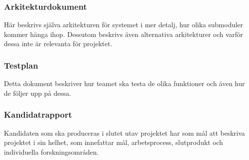 \subsubsection*{Arkitekturdokument}
Här beskrivs själva arkitekturen för systemet i mer detalj, hur olika submoduler kommer hänga
ihop. Dessutom beskrivs även alternativa arkitekturer och varför dessa inte är relevanta för
projektet.

\subsubsection*{Testplan}
Detta dokument beskriver hur teamet ska testa de olika funktioner och även hur de följer upp på
dessa.

\subsubsection*{Kandidatrapport}
Kandidaten som ska produceras i slutet utav projektet har som mål att beskriva projektet i
sin helhet, som innefattar mål, arbetsprocess, slutprodukt och individuella forskningsområden.

